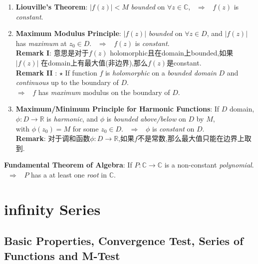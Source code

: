 \documentclass[9pt]{article}
\begin{document}
\begin{enumerate}[itemsep=-2pt, topsep=-2pt]
    \item \textbf{Liouville's Theorem}: $|f(z)|<M$ \textit{bounded} on $\forall z \in \mathbb{C}$, \ $\Rightarrow$ \ $f(z)$ is \textit{constant}.
    \item \textbf{Maximum Modulus Principle}: $|f(z)|$ \textit{bounded} on $\forall z \in D$, and $|f(z)|$ has \textit{maximum} at $z_0\in D$. \ $\Rightarrow$ \ $f(z)$ is \textit{constant}. \\
    \textbf{Remark I}: {\footnotesize 意思是对于$f(z)$ holomorphic且在domain上bounded,如果 $|f(z)|$ 在domain上有最大值(非边界),那么$f(z)$是constant.} \\
    \textbf{Remark II} : $\star$ If function $f$ is \textit{holomorphic} on a \textit{bounded domain} $D$ and \textit{continuous} up to the boundary of $D$. \\
    $\Rightarrow$ \ $f$ has \textit{maximum} modulus on the boundary of $D$. 
    \item {\small \textbf{Maximum/Minimum Principle for Harmonic Functions}: If $D$ domain, $\phi:D\to\mathbb{R}$ is \textit{harmonic}, and $\phi$ is \textit{bounded above/below} on $D$ by $M$,} \\
    {\small with $\phi(z_0)=M$ for some $z_0\in D$.} \ $\Rightarrow$ \ $\phi$ is \textit{constant} on $D$. \\
    \textbf{Remark}: {\footnotesize 对于调和函数$\phi:D\to\mathbb{R}$,如果$f$不是常数,那么最大值只能在边界上取到.}
\end{enumerate}

\textbf{Fundamental Theorem of Algebra}: If $P:\mathbb{C}\to\mathbb{C}$ is a non-constant \textit{polynomial}. \ $\Rightarrow$ \ $P$ has a at least one \textit{root} in $\mathbb{C}$.


\section{infinity Series} %

\subsection{Basic Properties, Convergence Test, Series of Functions and M-Test} %
\end{document}
